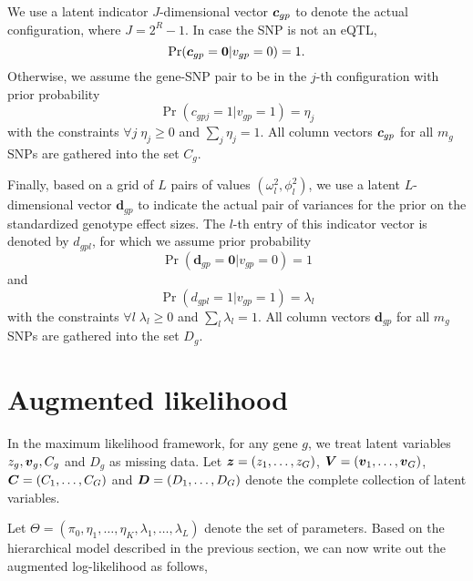 \documentclass[10pt]{article}
\newcommand{\Prob}{\Pr} %
\newcommand{\dv}{\bm{d}}
\newcommand{\cv}{\mbox{\boldmath$c$}}
\newcommand{\Cv}{\mbox{\boldmath$C$}}
\newcommand{\Dv}{\mbox{\boldmath$D$}}
\newcommand{\vv}{\mbox{\boldmath$v$}}
\newcommand{\Vv}{\mbox{\boldmath$V$}}
\newcommand{\zv}{\mbox{\boldmath$z$}}
\begin{document}
\bigskip

We use a latent indicator $J$-dimensional vector $\cv_{gp}$ to denote the actual configuration, where $J=2^R-1$.
In case the SNP is not an eQTL,
\begin{equation}
  \Prob(\cv_{gp} = \bm{0}  | v_{gp} = 0) = 1.
\end{equation}
Otherwise, we assume the gene-SNP pair to be in the $j$-th configuration with prior probability
\begin{equation}
  \Prob(c_{gpj} = 1 | v_{gp} = 1) = \eta_j
\end{equation}
with the constraints $\forall j \; \eta_j \ge 0$ and $\sum_j \eta_j = 1$.
All column vectors $\cv_{gp}$ for all $m_g$ SNPs are gathered into the set $C_g$.

\bigskip

Finally, based on a grid of $L$ pairs of values $(\omega_l^2,\phi_l^2)$, we use a latent $L$-dimensional vector $\dv_{gp}$ to indicate the actual pair of variances for the prior on the standardized genotype effect sizes.
The $l$-th entry of this indicator vector is denoted by $d_{gpl}$, for which we assume prior probability
\begin{equation}
  \Prob(\dv_{gp}= \bm{0} | v_{gp} = 0) =  1
\end{equation}
and
\begin{equation}
  \Prob(d_{gpl}=1 | v_{gp} = 1 ) =  \lambda_l
\end{equation}
with the constraints $\forall l \; \lambda_l \ge 0$ and $\sum_l \lambda_l = 1$.
All column vectors $\dv_{gp}$ for all $m_g$ SNPs are gathered into the set $D_g$.



\section{Augmented likelihood}

In the maximum likelihood framework, for any gene $g$, we treat latent variables $z_g, \vv_g, C_g$ and $D_g$ as missing data.
Let $\zv = (z_1,\dots,z_G)$, $\Vv = (\vv_1,\dots,\vv_G)$, $\Cv = (C_1,\dots,C_G)$ and $\Dv = (D_1,\dots,D_G)$ denote the complete collection of latent variables.

Let $\Theta=(\pi_0,\eta_1,\dots,\eta_K,\lambda_1,\dots,\lambda_L)$ denote the set of parameters.
Based on the hierarchical model described in the previous section, we can now write out the augmented log-likelihood as follows,
\end{document}

